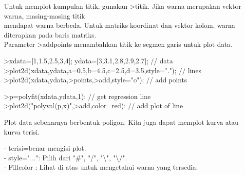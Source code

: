 \documentclass[a4paper,10pt]{article}
\begin{document}
\begin{eulernotebook}
\begin{eulercomment}
\begin{eulercomment}
\begin{eulercomment}
\begin{eulercomment}
\begin{eulercomment}
\begin{eulercomment}
\begin{eulercomment}
\begin{eulercomment}
\begin{eulercomment}
\begin{eulercomment}
\begin{eulercomment}
\begin{eulercomment}
\begin{eulercomment}
\begin{eulercomment}
\begin{eulercomment}
\begin{eulercomment}
\begin{eulercomment}
\begin{eulercomment}
\begin{eulercomment}
\begin{eulercomment}
\begin{eulercomment}
\begin{eulercomment}
\begin{eulercomment}
\begin{eulercomment}
\begin{eulercomment}
\begin{eulercomment}
\begin{eulercomment}
\begin{eulercomment}
\begin{eulercomment}
\begin{eulercomment}
\begin{eulercomment}
\begin{eulercomment}
\begin{eulercomment}
\begin{eulercomment}
\begin{eulercomment}
\begin{eulercomment}
\begin{eulercomment}
Untuk memplot kumpulan titik, gunakan \textgreater{}titik. Jika warna merupakan
vektor warna, masing-masing titik\\
mendapat warna berbeda. Untuk matriks koordinat dan vektor kolom,
warna diterapkan pada baris matriks.\\
Parameter \textgreater{}addpoints menambahkan titik ke segmen garis untuk plot
data.
\end{eulercomment}
\begin{eulerprompt}
>xdata=[1,1.5,2.5,3,4]; ydata=[3,3.1,2.8,2.9,2.7]; // data
>plot2d(xdata,ydata,a=0.5,b=4.5,c=2.5,d=3.5,style="."); // lines
>plot2d(xdata,ydata,>points,>add,style="o"): // add points
\end{eulerprompt}
\begin{eulerprompt}
>p=polyfit(xdata,ydata,1); // get regression line
>plot2d("polyval(p,x)",>add,color=red): // add plot of line
\end{eulerprompt}
\begin{eulercomment}
Plot data sebenarnya berbentuk poligon. Kita juga dapat memplot kurva
atau kurva terisi.

- terisi=benar mengisi plot.\\
- style="...": Pilih dari "#", "/", "\textbackslash{}", "\textbackslash{}/".\\
- Fillcolor : Lihat di atas untuk mengetahui warna yang tersedia.


\end{eulercomment}
\end{eulercomment}
\end{eulercomment}
\end{eulercomment}
\end{eulercomment}
\end{eulercomment}
\end{eulercomment}
\end{eulercomment}
\end{eulercomment}
\end{eulercomment}
\end{eulercomment}
\end{eulercomment}
\end{eulercomment}
\end{eulercomment}
\end{eulercomment}
\end{eulercomment}
\end{eulercomment}
\end{eulercomment}
\end{eulercomment}
\end{eulercomment}
\end{eulercomment}
\end{eulercomment}
\end{eulercomment}
\end{eulercomment}
\end{eulercomment}
\end{eulercomment}
\end{eulercomment}
\end{eulercomment}
\end{eulercomment}
\end{eulercomment}
\end{eulercomment}
\end{eulercomment}
\end{eulercomment}
\end{eulercomment}
\end{eulercomment}
\end{eulercomment}
\end{eulercomment}
\end{eulernotebook}
\end{document}
